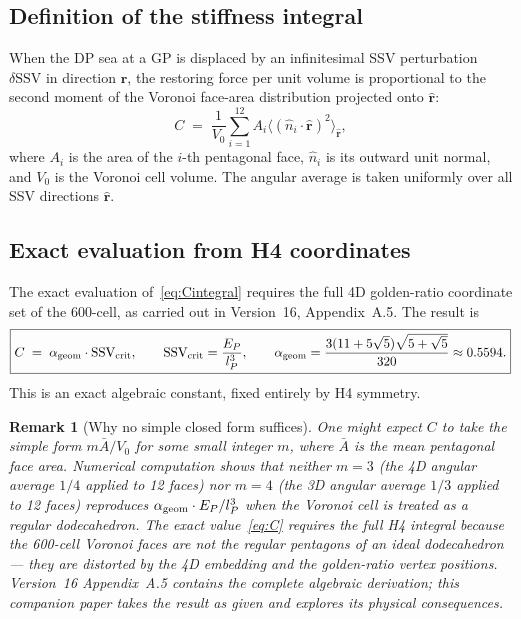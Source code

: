 \documentclass[12pt]{article}
\newtheorem{remark}[theorem]{Remark}
\newcommand{\lP}{l_P}
\newcommand{\EP}{E_P}
\newcommand{\SSV}{\text{SSV}}
\newcommand{\alphageom}{\alpha_{\rm geom}}
\newcommand{\SSVcrit}{\SSV_{\rm crit}}
\begin{document}
\subsection{Definition of the stiffness integral}

When the DP sea at a GP is displaced by an infinitesimal SSV perturbation
$\delta\SSV$ in direction $\hat{\mathbf{r}}$, the restoring force per unit
volume is proportional to the second moment of the Voronoi face-area
distribution projected onto $\hat{\mathbf{r}}$:
\begin{equation}
  C \;=\; \frac{1}{V_0}\sum_{i=1}^{12} A_i
  \bigl\langle(\hat{n}_i\cdot\hat{\mathbf{r}})^2\bigr\rangle_{\hat{\mathbf{r}}},
  \label{eq:Cintegral}
\end{equation}
where $A_i$ is the area of the $i$-th pentagonal face, $\hat{n}_i$ is its
outward unit normal, and $V_0$ is the Voronoi cell volume.  The angular
average is taken uniformly over all SSV directions $\hat{\mathbf{r}}$.

\subsection{Exact evaluation from H4 coordinates}

The exact evaluation of~\eqref{eq:Cintegral} requires the full 4D golden-ratio
coordinate set of the 600-cell, as carried out in Version~16, Appendix~A.5.
The result is
\begin{equation}
  \boxed{C \;=\; \alphageom\cdot\SSVcrit,\qquad
  \SSVcrit = \frac{\EP}{\lP^3},\qquad
  \alphageom = \frac{3(11+5\sqrt{5})\sqrt{5+\sqrt{5}}}{320}
  \approx 0.5594.}
  \label{eq:C}
\end{equation}
This is an exact algebraic constant, fixed entirely by H4 symmetry.

\begin{remark}[Why no simple closed form suffices]
One might expect $C$ to take the simple form $m\bar{A}/V_0$ for some small
integer $m$, where $\bar{A}$ is the mean pentagonal face area.  Numerical
computation shows that neither $m=3$ (the 4D angular average $1/4$ applied to
12 faces) nor $m=4$ (the 3D angular average $1/3$ applied to 12 faces)
reproduces $\alphageom\cdot\EP/\lP^3$ when the Voronoi cell is treated as a
regular dodecahedron.  The exact value~\eqref{eq:C} requires the full H4
integral because the 600-cell Voronoi faces are \emph{not} the regular
pentagons of an ideal dodecahedron --- they are distorted by the 4D embedding
and the golden-ratio vertex positions.  Version~16 Appendix~A.5 contains the
complete algebraic derivation; this companion paper takes the result as given
and explores its physical consequences.
\end{remark}
\end{document}

